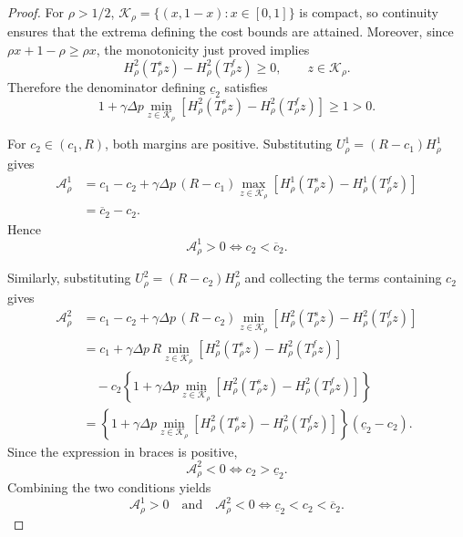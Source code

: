 \documentclass[11pt]{article}
\begin{document}
\begin{proof}
For $\rho>1/2$,
$\mathcal K_\rho=\{(x,1-x):x\in[0,1]\}$ is compact, so continuity
ensures that the extrema defining the cost bounds are attained.
Moreover, since $\rho x+1-\rho\ge\rho x$, the monotonicity just
proved implies
\begin{equation}
H_\rho^2(T_\rho^s z)-H_\rho^2(T_\rho^f z)\ge0,
\qquad z\in\mathcal K_\rho.
\end{equation}
Therefore the denominator defining $\underline c_2$ satisfies
\begin{equation}
1+\gamma\Delta p
\min_{z\in\mathcal K_\rho}
\left[
H_\rho^2(T_\rho^s z)-H_\rho^2(T_\rho^f z)
\right]
\ge1>0.
\end{equation}

For $c_2\in(c_1,R)$, both margins are positive. Substituting
$U_\rho^1=(R-c_1)H_\rho^1$ gives
\begin{equation}
\begin{aligned}
\mathcal A_\rho^1
&=c_1-c_2+\gamma\Delta p\,(R-c_1)
\max_{z\in\mathcal K_\rho}
\left[
H_\rho^1(T_\rho^s z)-H_\rho^1(T_\rho^f z)
\right]\\
&=\overline c_2-c_2.
\end{aligned}
\end{equation}
Hence
\begin{equation}
\mathcal A_\rho^1>0
\iff c_2<\overline c_2.
\end{equation}

Similarly, substituting $U_\rho^2=(R-c_2)H_\rho^2$ and collecting
the terms containing $c_2$ gives
\begin{equation}
\begin{aligned}
\mathcal A_\rho^2
&=c_1-c_2+\gamma\Delta p\,(R-c_2)
\min_{z\in\mathcal K_\rho}
\left[
H_\rho^2(T_\rho^s z)-H_\rho^2(T_\rho^f z)
\right]\\
&=c_1+\gamma\Delta p\,R
\min_{z\in\mathcal K_\rho}
\left[
H_\rho^2(T_\rho^s z)-H_\rho^2(T_\rho^f z)
\right]\\
&\quad
-c_2\left\{
1+\gamma\Delta p
\min_{z\in\mathcal K_\rho}
\left[
H_\rho^2(T_\rho^s z)-H_\rho^2(T_\rho^f z)
\right]
\right\}\\
&=
\left\{
1+\gamma\Delta p
\min_{z\in\mathcal K_\rho}
\left[
H_\rho^2(T_\rho^s z)-H_\rho^2(T_\rho^f z)
\right]
\right\}
(\underline c_2-c_2).
\end{aligned}
\end{equation}
Since the expression in braces is positive,
\begin{equation}
\mathcal A_\rho^2<0
\iff c_2>\underline c_2.
\end{equation}
Combining the two conditions yields
\begin{equation}
\mathcal A_\rho^1>0
\quad\text{and}\quad
\mathcal A_\rho^2<0
\iff
\underline c_2<c_2<\overline c_2.
\end{equation}


\end{proof}
\end{document}
